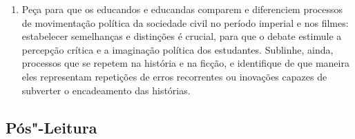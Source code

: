 \documentclass[12pt]{extarticle}
\begin{document}
\begin{enumerate}
\item Peça para que os educandos e educandas comparem e diferenciem processos
de movimentação política da sociedade civil no período imperial e nos
filmes: estabelecer semelhanças e distinções é crucial, para que o
debate estimule a percepção crítica e a imaginação política dos
estudantes. Sublinhe, ainda, processos que se repetem na história e na
ficção, e identifique de que maneira eles representam repetições de
erros recorrentes ou inovações capazes de subverter o encadeamento das
histórias.
\end{enumerate}


\subsection{Pós"-Leitura}


\end{document}
